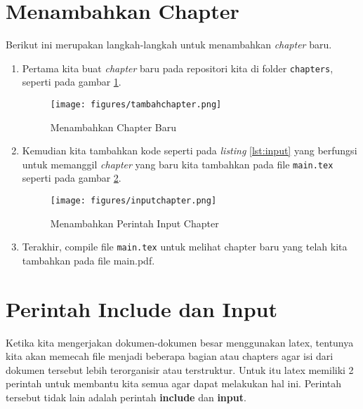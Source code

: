 \section{Menambahkan Chapter}
Berikut ini merupakan langkah-langkah untuk menambahkan \textit{chapter} baru.
\begin{enumerate}
\item Pertama kita buat \textit{chapter} baru pada repositori kita di folder \verb|chapters|, seperti pada gambar \ref{fig:tambahchapter}.

\begin{figure}[!htbp]
  \centering
  \texttt{[image: figures/tambahchapter.png]}
  \caption{Menambahkan Chapter Baru}\label{fig:tambahchapter}
\end{figure}

\item Kemudian kita tambahkan kode seperti pada \textit{listing} \ref{lst:input} yang berfungsi untuk memanggil \textit{chapter} yang baru kita tambahkan pada file \verb|main.tex| seperti pada gambar \ref{fig:inputchapter}.



\begin{figure}[!htbp]
  \centering
  \texttt{[image: figures/inputchapter.png]}
  \caption{Menambahkan Perintah Input Chapter}\label{fig:inputchapter}
\end{figure}

\item Terakhir, compile file \verb|main.tex| untuk melihat chapter baru yang telah kita tambahkan pada file main.pdf.
\end{enumerate}

\section{Perintah Include dan Input}
Ketika kita mengerjakan dokumen-dokumen besar menggunakan latex, tentunya kita akan memecah file menjadi beberapa bagian atau chapters agar isi dari dokumen tersebut lebih terorganisir atau terstruktur. Untuk itu latex memiliki 2 perintah untuk membantu kita semua agar dapat melakukan hal ini. Perintah tersebut tidak lain adalah perintah \textbf{include} dan \textbf{input}.
